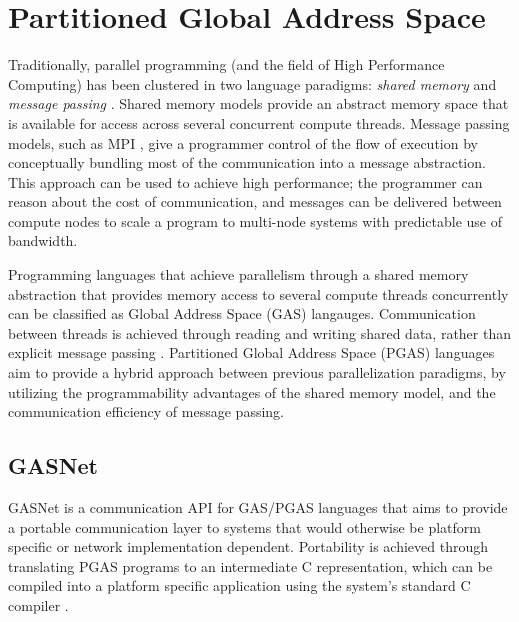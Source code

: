 \documentclass{uit-report}
\begin{document}

\newpage
\chapter{Partitioned Global Address Space}
\cite{pgas_upc_energy}

Traditionally, parallel programming (and the field of High Performance Computing) has been clustered in two language paradigms: \emph{shared memory }and \emph{message passing} \cite{pgas_languages}.  Shared memory models provide an abstract memory space that is available for access across several concurrent compute threads. Message passing models, such as MPI \cite{MPI}, give a programmer control of the flow of execution by conceptually bundling most of the communication into a message abstraction. This approach can be used to achieve high performance; the programmer can reason about the cost of communication, and messages can be delivered between compute nodes to scale a program to multi-node systems with predictable use of bandwidth.


Programming languages that achieve parallelism through a shared memory abstraction that provides memory access to several compute threads concurrently can be classified as Global Address Space (GAS) langauges. Communication between threads is achieved through reading and writing shared data, rather than explicit message passing \cite{gasnet_description}. Partitioned Global Address Space (PGAS) languages aim to provide a hybrid approach between previous parallelization paradigms, by utilizing the programmability advantages of the shared memory model, and the communication efficiency of message passing.

\section{GASNet}
GASNet is a communication API for GAS/PGAS languages that aims to provide a portable communication layer to systems that would otherwise be platform specific or network implementation dependent. Portability is achieved through translating PGAS programs to an intermediate C representation, which can be compiled into a platform specific application using the system's standard C compiler \cite{gasnet_description}.
\end{document}
